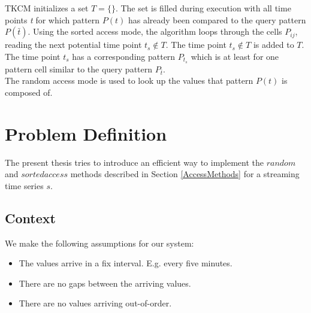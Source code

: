 \documentclass[abstracton,12pt]{scrreprt}
\begin{document}
TKCM initializes a set $T =\{\}$. The set is filled during execution with all time points \emph{t} for which pattern $P(t)$ has already been compared to the query pattern $P(\bar{t})$. 
Using the sorted access mode, the algorithm loops through the cells $P_{ij}$, reading the next potential time point $t_s \notin T$. The time point $t_s \notin T$ is added to $T$. The time point $t_s$ has a corresponding pattern $P_{t_s}$ which is at least for one pattern cell similar to the query pattern $P_{\bar{t}}$.\\
The random access mode is used to look up the values that pattern $P(t)$ is composed of. 

\chapter{Problem Definition}
The present thesis tries to introduce an efficient way to implement the $random$ and $sorted access$ methods described in Section \ref{AccessMethods} for a streaming time series $s$.

\section{Context}
We make the following assumptions for our system: 
\begin{itemize}  
	\item The values arrive in a fix interval. E.g. every five minutes. 
	\item There are no gaps between the arriving values. 
	\item There are no values arriving out-of-order. 
\end{itemize}
\end{document}

